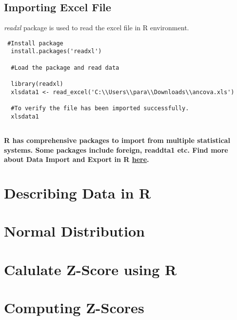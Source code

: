\documentclass[
]{book}
\begin{document}
\hypertarget{importing-excel-file}{%
\section{Importing Excel File}\label{importing-excel-file}}

\emph{readxl} package is used to read the excel file in R environment.

\begin{verbatim}
 #Install package
  install.packages('readxl')
  
  #Load the package and read data
  
  library(readxl)
  xlsdata1 <- read_excel('C:\\Users\\para\\Downloads\\ancova.xls')
  
  #To verify the file has been imported successfully.
  xlsdata1
  
\end{verbatim}

\textbf{R has comprehensive packages to import from multiple statistical systems. Some packages include foreign, readdta1 etc. Find more about Data Import and Export in R \href{https://cran.r-project.org/doc/manuals/r-release/R-data.html}{here}.}

\hypertarget{describing-data-in-r}{%
\chapter{Describing Data in R}\label{describing-data-in-r}}

\hypertarget{normal-distribution}{%
\chapter{Normal Distribution}\label{normal-distribution}}

\hypertarget{calulate-z-score-using-r}{%
\chapter{Calulate Z-Score using R}\label{calulate-z-score-using-r}}

\hypertarget{computing-z-scores}{%
\chapter{Computing Z-Scores}\label{computing-z-scores}}
\end{document}
